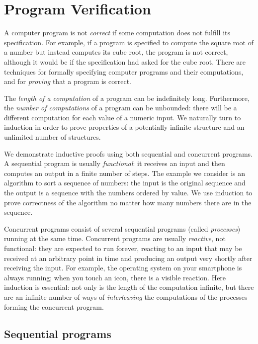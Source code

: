 \documentclass[11pt,a4paper]{report}
\begin{document}

\chapter{Program Verification}\label{s.verif}

A computer program is not \emph{correct} if some computation does not fulfill its specification. For example, if a program is specified to compute the square root of a number but instead computes its cube root, the program is not correct, although it would be if the specification had asked for the cube root. There are techniques for formally specifying computer programs and their computations, and for \emph{proving} that a program is correct.

The \emph{length of a computation} of a program can be indefinitely long. Furthermore, the \emph{number of computations} of a program can be unbounded: there will be a different computation for each value of a numeric input. We naturally turn to induction in order to prove properties of a potentially infinite structure and an unlimited number of structures.

We demonstrate inductive proofs using both sequential and concurrent programs. A sequential program is usually \emph{functional}: it receives an input and then computes an output in a finite number of steps. The example we consider is an algorithm to sort a sequence of numbers: the input is the original sequence and the output is a sequence with the numbers ordered by value. We use induction to prove correctness of the algorithm no matter how many numbers there are in the sequence.

Concurrent programs consist of several sequential programs (called \emph{processes}) running at the same time. Concurrent programs are usually \emph{reactive}, not functional: they are expected to run forever, reacting to an input that may be received at an arbitrary point in time and producing an output very shortly after receiving the input. For example, the operating system on your smartphone is always running; when you touch an icon, there is a visible reaction. Here induction is essential: not only is the length of the computation infinite, but there are an infinite number of ways of \emph{interleaving} the computations of the processes forming the concurrent program.

\section{Sequential programs}
\end{document}
